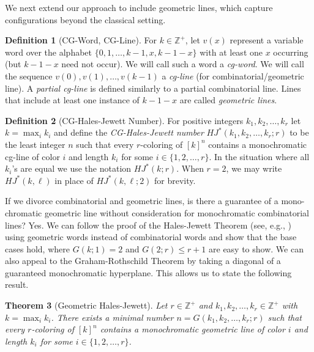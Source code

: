 \documentclass[11pt]{article}
\newtheorem{thm}{Theorem}
\theoremstyle{definition}
\newtheorem{defn}[thm]{Definition}
\begin{document}
We next extend our approach to include geometric lines, which capture configurations beyond the classical setting.



\begin{defn}[CG-Word, CG-Line] For $k \in \mathbb{Z}^+$, let $v(x)$ represent a variable word
over the alphabet $\{0,1,\dots,k-1,x,k-1-x\}$ with at least one $x$ occurring (but $k-1-x$ need not occur).
We will call such a word a {\it cg-word}.
We will call the sequence $v(0), v(1),\dots,v(k-1)$ a {\it cg-line} (for combinatorial/geometric line).  A {\it partial cg-line} is defined
similarly to a partial combinatorial line.
Lines that include at least one instance of
$k-1-x$ are called {\it geometric lines}.




\end{defn}

\begin{defn}[CG-Hales-Jewett Number]\label{def20}
For positive integers $k_1,k_2,  \dots, k_r$
let $k = \max_i k_i$ and define the
{\it CG-Hales-Jewett number}
$HJ^*(k_1,k_2,\dots,k_r;r)$ to be the least integer $n$ such that every $r$-coloring of $[k]^n$ contains  
a monochromatic cg-line of color $i$ and length $k_i$ for some $i \in \{1,2,\dots,r\}$.
In the situation where all $k_i$'s are equal we use the notation 
$HJ^*(k;r)$.
When $r = 2$, we may write $HJ^*(k,\ell)$ in place of $HJ^*(k,\ell;2)$ for brevity.
\end{defn}

{If we divorce combinatorial and geometric lines,
is there a guarantee of a mono-chromatic geometric line without 
consideration for monochromatic combinatorial lines?
Yes.  We can  follow the proof of the Hales-Jewett Theorem
(see, e.g., \cite{Rob})
using geometric words instead of combinatorial words
and show that the base cases hold, where $G(k;1)=2$ and $G(2;r) \leq r+1$ are easy to show. 
We can also appeal to the Graham-Rothschild Theorem \cite{GR} by taking a 
diagonal of a guaranteed monochromatic hyperplane. This allows us to state the
following result.
}

\begin{thm}[Geometric Hales-Jewett]\label{thm21} Let $r \in \mathbb{Z}^+$ and $k_1,k_2,  \dots, k_r \in \mathbb{Z}^+$
with $k = \max_i k_i$.
There exists a minimal number 
$n=G(k_1,k_2,\dots,k_r;r)$ such that every $r$-coloring of $[k]^n$ contains  
a monochromatic geometric line of color $i$ and length $k_i$ for some $i \in \{1,2,\dots,r\}$. 
\end{thm}
\end{document}
